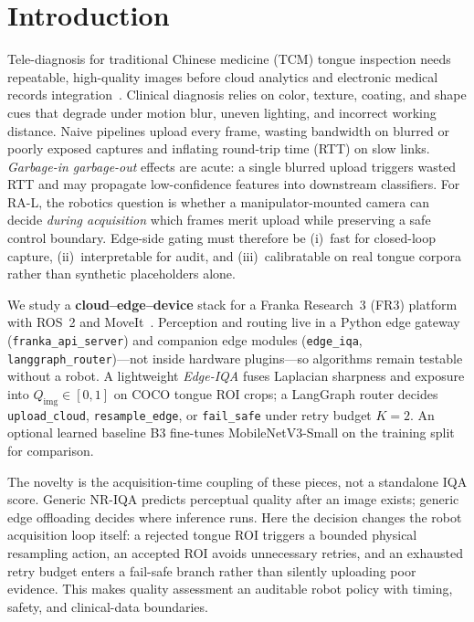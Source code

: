 \section{Introduction}
\label{sec:intro}

Tele-diagnosis for traditional Chinese medicine (TCM) tongue inspection needs repeatable, high-quality images before cloud analytics and electronic medical records integration~\cite{zhang2020tongue,qi2016tongue}.
Clinical diagnosis relies on color, texture, coating, and shape cues that degrade under motion blur, uneven lighting, and incorrect working distance.
Naive pipelines upload every frame, wasting bandwidth on blurred or poorly exposed captures and inflating round-trip time (RTT) on slow links.
\emph{Garbage-in garbage-out} effects are acute: a single blurred upload triggers wasted RTT and may propagate low-confidence features into downstream classifiers.
For RA-L, the robotics question is whether a manipulator-mounted camera can decide \emph{during acquisition} which frames merit upload while preserving a safe control boundary.
Edge-side gating must therefore be (i)~fast for closed-loop capture, (ii)~interpretable for audit, and (iii)~calibratable on real tongue corpora rather than synthetic placeholders alone.

We study a \textbf{cloud--edge--device} stack for a Franka Research~3 (FR3) platform with ROS~2 and MoveIt~\cite{moore2021ros2,chitta2009moveit}.
Perception and routing live in a Python edge gateway (\texttt{franka\_api\_server}) and companion edge modules (\texttt{edge\_iqa}, \texttt{langgraph\_router})---not inside hardware plugins---so algorithms remain testable without a robot.
A lightweight \emph{Edge-IQA} fuses Laplacian sharpness and exposure into $Q_{\mathrm{img}}\in[0,1]$ on COCO tongue ROI crops; a LangGraph router decides \texttt{upload\_cloud}, \texttt{resample\_edge}, or \texttt{fail\_safe} under retry budget $K{=}2$.
An optional learned baseline B3 fine-tunes MobileNetV3-Small on the training split for comparison.

The novelty is the acquisition-time coupling of these pieces, not a standalone IQA score.
Generic NR-IQA predicts perceptual quality after an image exists; generic edge offloading decides where inference runs.
Here the decision changes the robot acquisition loop itself: a rejected tongue ROI triggers a bounded physical resampling action, an accepted ROI avoids unnecessary retries, and an exhausted retry budget enters a fail-safe branch rather than silently uploading poor evidence.
This makes quality assessment an auditable robot policy with timing, safety, and clinical-data boundaries.

